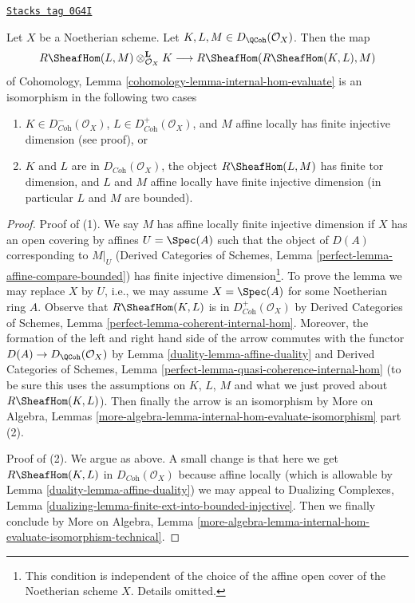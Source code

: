 \begin{lemma}
\label{duality-lemma-internal-hom-evaluate-isom}
\href{https://stacks.math.columbia.edu/tag/0G4I}{\texttt{Stacks tag 0G4I}}

Let $X$ be a Noetherian scheme. Let $K, L, M \in D_\QCoh(\mathcal{O}_X)$.
Then the map
$$
R\SheafHom(L, M) \otimes_{\mathcal{O}_X}^\mathbf{L} K
\longrightarrow
R\SheafHom(R\SheafHom(K, L), M)
$$
of Cohomology, Lemma \ref{cohomology-lemma-internal-hom-evaluate}
is an isomorphism in the following two cases
\begin{enumerate}
\item $K \in D^-_{\textit{Coh}}(\mathcal{O}_X)$,
$L \in D^+_{\textit{Coh}}(\mathcal{O}_X)$, and $M$ affine locally has
finite injective dimension (see proof), or
\item $K$ and $L$ are in $D_{\textit{Coh}}(\mathcal{O}_X)$,
the object $R\SheafHom(L, M)$ has finite tor dimension, and
$L$ and $M$ affine locally have finite injective dimension
(in particular $L$ and $M$ are bounded).
\end{enumerate}
\end{lemma}

\begin{proof}

Proof of (1). We say $M$ has affine locally finite injective dimension
if $X$ has an open covering by affines $U = \Spec(A)$ such that the object
of $D(A)$ corresponding to $M|_U$ (Derived Categories of Schemes, Lemma
\ref{perfect-lemma-affine-compare-bounded})
has finite injective dimension\footnote{This condition is independent of the
choice of the affine open cover of the Noetherian scheme $X$.
Details omitted.}. To prove the lemma we may
replace $X$ by $U$, i.e., we may assume $X = \Spec(A)$
for some Noetherian ring $A$. Observe that
$R\SheafHom(K, L)$ is in $D^+_{\textit{Coh}}(\mathcal{O}_X)$ by
Derived Categories of Schemes, Lemma
\ref{perfect-lemma-coherent-internal-hom}.
Moreover, the formation of the left and right hand side
of the arrow commutes with the functor $D(A) \to D_\QCoh(\mathcal{O}_X)$ by
Lemma \ref{duality-lemma-affine-duality} and
Derived Categories of Schemes, Lemma
\ref{perfect-lemma-quasi-coherence-internal-hom}
(to be sure this uses the assumptions on $K$, $L$, $M$ and what we just
proved about $R\SheafHom(K, L)$).
Then finally the arrow is an isomorphism by
More on Algebra, Lemmas
\ref{more-algebra-lemma-internal-hom-evaluate-isomorphism} part (2).

\medskip\noindent
Proof of (2). We argue as above. A small change is that here we get
$R\SheafHom(K, L)$ in $D_{\textit{Coh}}(\mathcal{O}_X)$ because
affine locally (which is allowable by Lemma \ref{duality-lemma-affine-duality})
we may appeal to Dualizing Complexes, Lemma
\ref{dualizing-lemma-finite-ext-into-bounded-injective}.
Then we finally conclude by
More on Algebra, Lemma
\ref{more-algebra-lemma-internal-hom-evaluate-isomorphism-technical}.
\end{proof}

